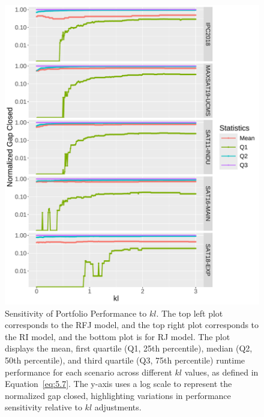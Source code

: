 \begin{figure}
    \includegraphics[width=0.49\linewidth]{plots/kl_div_rj_sensitivity_x_theta_y_runtime_facet.pdf}
    \caption[Sensitivity of Portfolio Performance to $kl$]{Sensitivity of Portfolio Performance to $kl$. The top left plot corresponds to the RFJ model, and the top right plot corresponds to the RI model, and the bottom plot is for RJ model. The plot displays the mean, first quartile (Q1, 25th percentile), median (Q2, 50th percentile), and third quartile (Q3, 75th percentile) runtime performance for each scenario across different $kl$ values, as defined in Equation~\ref{eq:5.7}. The y-axis uses a log scale to represent the normalized gap closed, highlighting variations in performance sensitivity relative to $kl$ adjustments.}
    \label{fig:kl_sensitivity}
\end{figure}

